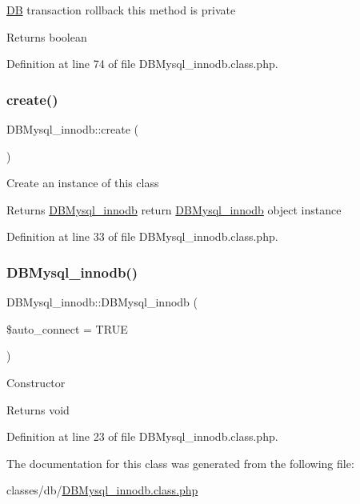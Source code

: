 \hyperlink{classDB}{DB} transaction rollback this method is private \begin{DoxyReturn}{Returns}
boolean 
\end{DoxyReturn}


Definition at line 74 of file D\+B\+Mysql\+\_\+innodb.\+class.\+php.

\mbox{\label{classDBMysql__innodb_ac00d0e52855fb50fc453dd78367de102}} 
\subsubsection{\texorpdfstring{create()}{create()}}
{\footnotesize\ttfamily D\+B\+Mysql\+\_\+innodb\+::create (\begin{DoxyParamCaption}{ }\end{DoxyParamCaption})}

Create an instance of this class \begin{DoxyReturn}{Returns}
\hyperlink{classDBMysql__innodb}{D\+B\+Mysql\+\_\+innodb} return \hyperlink{classDBMysql__innodb}{D\+B\+Mysql\+\_\+innodb} object instance 
\end{DoxyReturn}


Definition at line 33 of file D\+B\+Mysql\+\_\+innodb.\+class.\+php.

\mbox{\label{classDBMysql__innodb_a427178f2ed07dbec683c2de9d0be925d}} 
\subsubsection{\texorpdfstring{D\+B\+Mysql\+\_\+innodb()}{DBMysql\_innodb()}}
{\footnotesize\ttfamily D\+B\+Mysql\+\_\+innodb\+::\+D\+B\+Mysql\+\_\+innodb (\begin{DoxyParamCaption}\item[{}]{\$auto\+\_\+connect = {\ttfamily TRUE} }\end{DoxyParamCaption})}

Constructor \begin{DoxyReturn}{Returns}
void 
\end{DoxyReturn}


Definition at line 23 of file D\+B\+Mysql\+\_\+innodb.\+class.\+php.



The documentation for this class was generated from the following file\+:\begin{DoxyCompactItemize}
\item 
classes/db/\hyperlink{DBMysql__innodb_8class_8php}{D\+B\+Mysql\+\_\+innodb.\+class.\+php}\end{DoxyCompactItemize}
